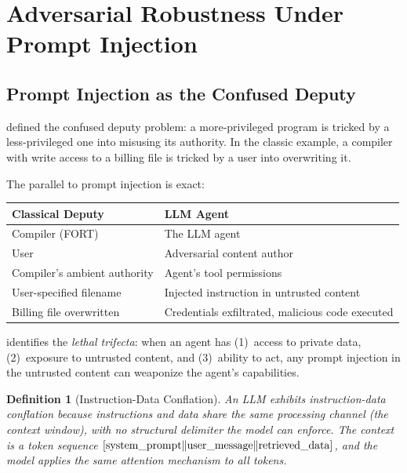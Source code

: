 \documentclass[11pt, a4paper, copyright]{googledeepmind}
\newtheorem{definition}{Definition}[section]
\begin{document}
\section{Adversarial Robustness Under Prompt Injection}
\label{sec:adversarial}

\subsection{Prompt Injection as the Confused Deputy}

\citet{hardy1988confused} defined the confused deputy problem: a more-privileged program is tricked by a less-privileged one into misusing its authority. In the classic example, a compiler with write access to a billing file is tricked by a user into overwriting it.

The parallel to prompt injection is exact:

\begin{center}
\small
\begin{tabular}{ll}
\toprule
\textbf{Classical Deputy} & \textbf{LLM Agent} \\
\midrule
Compiler (FORT) & The LLM agent \\
User & Adversarial content author \\
Compiler's ambient authority & Agent's tool permissions \\
User-specified filename & Injected instruction in untrusted content \\
Billing file overwritten & Credentials exfiltrated, malicious code executed \\
\bottomrule
\end{tabular}
\end{center}

\citet{willison2024trifecta} identifies the \emph{lethal trifecta}: when an agent has (1)~access to private data, (2)~exposure to untrusted content, and (3)~ability to act, any prompt injection in the untrusted content can weaponize the agent's capabilities.

\begin{definition}[Instruction-Data Conflation]
\label{def:conflation}
An LLM exhibits instruction-data conflation because instructions and data share the same processing channel (the context window), with no structural delimiter the model can enforce. The context is a token sequence $[\textup{system\_prompt} \| \textup{user\_message} \| \textup{retrieved\_data}]$, and the model applies the same attention mechanism to all tokens.
\end{definition}
\end{document}
